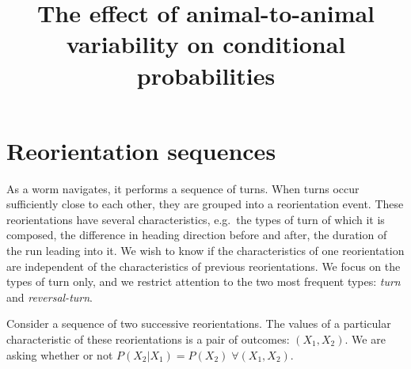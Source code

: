 \documentclass[12pt]{article}
\title{The effect of animal-to-animal variability on conditional probabilities}
\newcommand{\sref}[1]{\S\ref{#1}}
\newcommand{\eg}{e.g.\ }
\begin{document}
\maketitle







\section{Reorientation sequences}\label{sec:reoseq}

As a worm navigates, it performs a sequence of turns. When turns occur sufficiently close to each other, they are grouped into a reorientation event. These reorientations have several characteristics, \eg the types of turn of which it is composed, the difference in heading direction before and after, the duration of the run leading into it. We wish to know if the characteristics of one reorientation are independent of the characteristics of previous reorientations. We focus on the types of turn only, and we restrict attention to the two most frequent types: \emph{turn} and \emph{reversal-turn}.

Consider a sequence of two successive reorientations. The values of a particular characteristic of these reorientations is a pair of outcomes: $(X_1,X_2)$. We are asking whether or not $P(X_2|X_1) = P(X_2) \; \forall (X_1,X_2)$.

%
\end{document}
